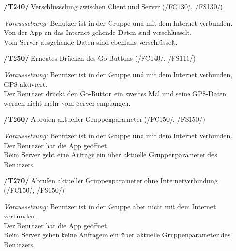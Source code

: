 \textbf{/T240/} Verschlüsselung zwischen Client und Server (/FC130/, /FS130/)\\
\begin{center}
\vspace{-\parskip}
\begin{minipage}[t]{0.9\textwidth}
\emph{Voraussetzung:} Benutzer ist in der Gruppe und mit dem Internet verbunden.            \\
Von der App an das Internet gehende Daten sind verschlüsselt.                         \\
Vom Server ausgehende Daten sind ebenfalls verschlüsselt.                              \\
\end{minipage}
\end{center}

\textbf{/T250/} Erneutes Drücken des Go-Buttons (/FC140/, /FS110/)\\
\begin{center}
\vspace{-\parskip}
\begin{minipage}[t]{0.9\textwidth}
\emph{Voraussetzung:} Benutzer ist in der Gruppe und mit dem Internet verbunden, GPS aktiviert.    \\
Der Benutzer drückt den Go-Button ein zweites Mal und seine GPS-Daten werden nicht mehr vom Server empfangen.\\
\end{minipage}
\end{center}

\textbf{/T260/} Abrufen aktueller Gruppenparameter (/FC150/, /FS150/)\\
\begin{center}
\vspace{-\parskip}
\begin{minipage}[t]{0.9\textwidth}
\emph{Voraussetzung:} Benutzer ist in der Gruppe und mit dem Internet verbunden.     \\
Der Benutzer hat die App geöffnet.                                             \\
Beim Server geht eine Anfrage ein über aktuelle Gruppenparameter des Benutzers. \\
\end{minipage}
\end{center}

\textbf{/T270/} Abrufen aktueller Gruppenparameter ohne Internetverbindung (/FC150/, /FS150/)\\
\begin{center}
\vspace{-\parskip}
\begin{minipage}[t]{0.9\textwidth}
\emph{Voraussetzung:} Benutzer ist in der Gruppe aber nicht mit dem Internet verbunden. \\
Der Benutzer hat die App geöffnet.                                                \\
Beim Server gehen keine Anfragem ein über aktuelle Gruppenparameter des Benutzers. \\
\end{minipage}
\end{center}

